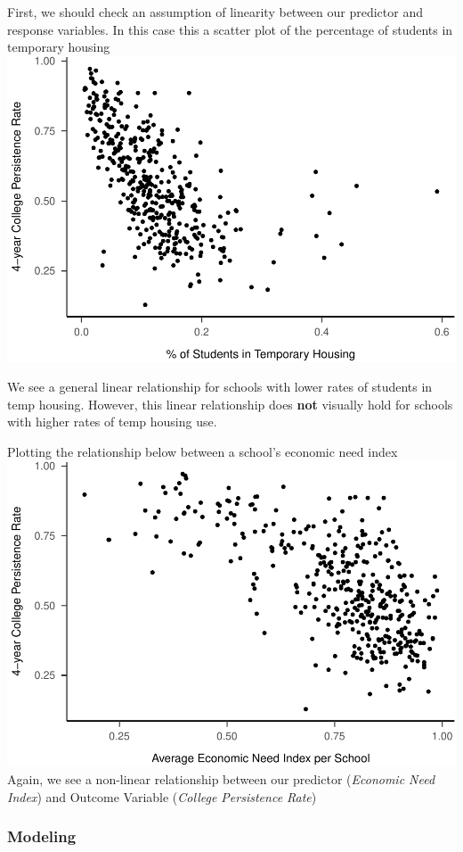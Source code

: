 \documentclass[
  man]{apa6}
\begin{document}
First, we should check an assumption of linearity between our predictor and response variables. In this case this a scatter plot of the percentage of students in temporary housing
\includegraphics{final-project_files/figure-latex/plot-housing-vs-college-1.pdf}

We see a general linear relationship for schools with lower rates of students in temp housing. However, this linear relationship does \textbf{not} visually hold for schools with higher rates of temp housing use.

Plotting the relationship below between a school's economic need index
\includegraphics{final-project_files/figure-latex/plot-need-vs-college-1.pdf}
Again, we see a non-linear relationship between our predictor (\emph{Economic Need Index}) and Outcome Variable (\emph{College Persistence Rate})

\hypertarget{modeling}{%
\subsubsection{Modeling}\label{modeling}}
\end{document}
